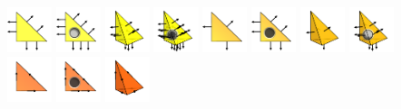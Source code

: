 \begin{frame}
\includegraphics[width=1.3cm]{png/BDM1_2d.png}
\includegraphics[width=1.3cm]{png/BDM2_2d.png}
\includegraphics[width=1.3cm]{png/BDM1_3d.png}
\includegraphics[width=1.3cm]{png/BDM2_3d.png}
\includegraphics[width=1.3cm]{png/RT1_2d.png}
\includegraphics[width=1.3cm]{png/RT2_2d.png}
\includegraphics[width=1.3cm]{png/RT1_3d.png}
\includegraphics[width=1.3cm]{png/RT2_3d.png} \\
\includegraphics[width=1.3cm]{png/NED1_1_2d.png}
\includegraphics[width=1.3cm]{png/NED1_2_2d.png}
\includegraphics[width=1.3cm]{png/NED1_1_3d.png}

\end{frame}
